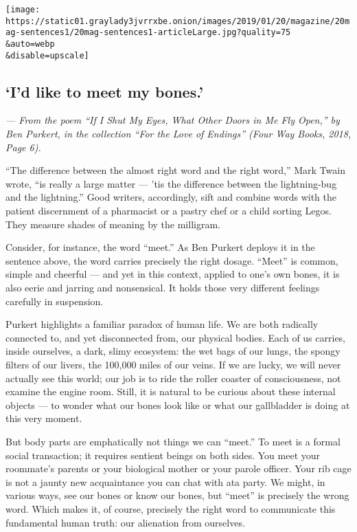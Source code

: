 \texttt{[image: https://static01.graylady3jvrrxbe.onion/images/2019/01/20/magazine/20mag-sentences1/20mag-sentences1-articleLarge.jpg?quality=75\\\&auto=webp\\\&disable=upscale]}

\hypertarget{id-like-to-meet-my-bones}{%
\subsection{`I'd like to meet my
bones.'}\label{id-like-to-meet-my-bones}}

\emph{--- From the poem ``If I Shut My Eyes, What Other Doors in Me Fly
Open,'' by Ben Purkert, in the collection ``For the Love of Endings''
(Four Way Books, 2018, Page 6).}

``The difference between the almost right word and the right word,''
Mark Twain wrote, ``is really a large matter --- 'tis the difference
between the lightning-bug and the lightning.'' Good writers,
accordingly, sift and combine words with the patient discernment of a
pharmacist or a pastry chef or a child sorting Legos. They measure
shades of meaning by the milligram.

Consider, for instance, the word ``meet.'' As Ben Purkert deploys it in
the sentence above, the word carries precisely the right dosage.
``Meet'' is common, simple and cheerful --- and yet in this context,
applied to one's own bones, it is also eerie and jarring and
nonsensical. It holds those very different feelings carefully in
suspension.

Purkert highlights a familiar paradox of human life. We are both
radically connected to, and yet disconnected from, our physical bodies.
Each of us carries, inside ourselves, a dark, slimy ecosystem: the wet
bags of our lungs, the spongy filters of our livers, the 100,000 miles
of our veins. If we are lucky, we will never actually see this world;
our job is to ride the roller coaster of consciousness, not examine the
engine room. Still, it is natural to be curious about these internal
objects --- to wonder what our bones look like or what our gallbladder
is doing at this very moment.

But body parts are emphatically not things we can ``meet.'' To meet is a
formal social transaction; it requires sentient beings on both sides.
You meet your roommate's parents or your biological mother or your
parole officer. Your rib cage is not a jaunty new acquaintance you can
chat with ata party. We might, in various ways, see our bones or know
our bones, but ``meet'' is precisely the wrong word. Which makes it, of
course, precisely the right word to communicate this fundamental human
truth: our alienation from ourselves.

